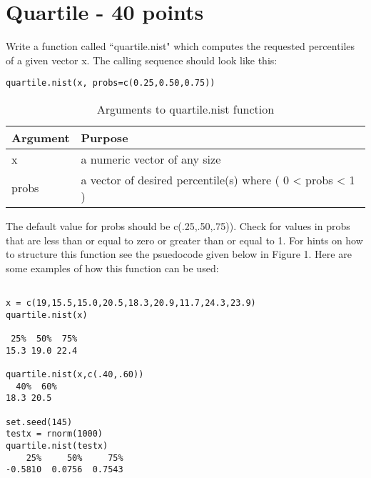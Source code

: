 \documentclass{article}
\begin{document}
\section{Quartile - 40 points}
Write a function called ``quartile.nist" which computes the requested percentiles of a given vector x. The calling sequence should look like this:
\begin{verbatim}
quartile.nist(x, probs=c(0.25,0.50,0.75))
\end{verbatim}

\begin{table}[ht]
\caption{Arguments to quartile.nist function}
\begin{tabular}{l | l}
\hline\hline
Argument & Purpose \\ [1ex]
\hline
x & a numeric vector of any size \\ [1ex]
\hline 
probs & a vector of desired percentile(s) where ( 0 < probs < 1 ) \\ 
\hline
\end{tabular}
\label{table:nonlin}
\end{table}

The default value for probs should be c(.25,.50,.75)). Check for values in probs that are less than or equal to zero or greater than or equal to 1. For hints on how to structure this function see the psuedocode given below in Figure 1.  Here are some examples of how this function can be used:
\begin{verbatim}

x = c(19,15.5,15.0,20.5,18.3,20.9,11.7,24.3,23.9)
quartile.nist(x)

 25%  50%  75% 
15.3 19.0 22.4

quartile.nist(x,c(.40,.60))
  40%  60% 
18.3 20.5 

set.seed(145)
testx = rnorm(1000)
quartile.nist(testx)
    25%     50%     75% 
-0.5810  0.0756  0.7543

\end{verbatim}
\end{document}

